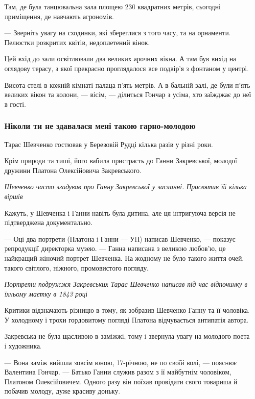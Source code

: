 \documentclass[a4paper,11pt]{extreport}
\begin{document}
Там, де була танцювальна зала площею 230 квадратних метрів, сьогодні приміщення, де навчають агрономів.

--- Зверніть увагу на сходинки, які збереглися з того часу, та на орнаменти.
Пелюстки розкритих квітів, недоплетений вінок. 

Цей вхід до зали освітлювали два великих арочних вікна. А там був вихід на
оглядову терасу, з якої прекрасно проглядалося все подвір’я з фонтаном у
центрі.

Висота стелі в кожній кімнаті палаца п’ять метрів. А в бальній залі, де були
п’ять великих вікон та колони, --- вісім, --- ділиться Гончар з усіма, хто заїжджає
до неї в гості.

\subsubsection{Ніколи ти не здавалася мені такою гарно-молодою}

Тарас Шевченко гостював у Березовій Рудці кілька разів у різні роки.

Крім природи та тиші, його вабила пристрасть до Ганни Закревської, молодої
дружини Платона Олексійовича Закревського.

\emph{Шевченко часто згадував про Ганну Закревської у засланні. Присвятив їй кілька віршів}

Кажуть, у Шевченка і Ганни навіть була дитина, але ця інтригуюча версія не
підтверджена документально.

--- Оці два портрети (Платона і Ганни --- УП) написав Шевченко, --- показує
репродукції директорка музею. --- Ганна написана з великою любов’ю, це найкращий
жіночий портрет Шевченка. На жодному не було такого життя очей, такого
світлого, ніжного, промовистого погляду. 

\emph{Портрети подружжя Закревських Тарас Шевченко написав під час відпочинку в їхньому маєтку в 1843 році}

Критики відзначають різницю в тому, як зобразив Шевченко Ганну та її чоловіка.
У холодному і трохи гордовитому погляді Платона відчувається антипатія автора.

Закревська не була щасливою в заміжжі, тому і звернула увагу на молодого поета
і художника.

--- Вона заміж вийшла зовсім юною, 17-річною, не по своїй волі, --- пояснює
Валентина Гончар. ---  Батько Ганни служив разом з її майбутнім чоловіком,
Платоном Олексійовичем. Одного разу він поїхав провідати свого товариша й
побачив молоду, дуже красиву доньку. 
\end{document}
